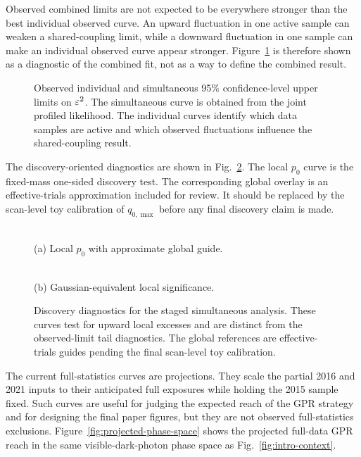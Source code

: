 Observed combined limits are not expected to be everywhere stronger than the best
individual observed curve. An upward fluctuation in one active sample can weaken a
shared-coupling limit, while a downward fluctuation in one sample can make an
individual observed curve appear stronger. Figure~\ref{fig:individual-overlay} is
therefore shown as a diagnostic of the combined fit, not as a way to define the
combined result.

\begin{figure}[t]
\centering
{}
\caption{Observed individual and simultaneous 95\% confidence-level upper limits on
$\varepsilon^2$. The simultaneous curve is obtained from the joint profiled likelihood. The
individual curves identify which data samples are active and which observed
fluctuations influence the shared-coupling result.}
\label{fig:individual-overlay}
\end{figure}

The discovery-oriented diagnostics are shown in Fig.~\ref{fig:combined-discovery}.
The local $p_0$ curve is the fixed-mass one-sided discovery test. The corresponding
global overlay is an effective-trials approximation included for review. It should be
replaced by the scan-level toy calibration of $q_{0,\max}$ before any final discovery
claim is made.

\begin{figure}[t]
\centering
\begin{minipage}{0.48\textwidth}
\centering
{}\\
(a) Local $p_0$ with approximate global guide.
\end{minipage}
\hfill
\begin{minipage}{0.48\textwidth}
\centering
{}\\
(b) Gaussian-equivalent local significance.
\end{minipage}
\caption{Discovery diagnostics for the staged simultaneous analysis. These curves test
for upward local excesses and are distinct from the observed-limit tail diagnostics.
The global references are effective-trials guides pending the final scan-level toy
calibration.}
\label{fig:combined-discovery}
\end{figure}

The current full-statistics curves are projections. They scale the partial 2016 and
2021 inputs to their anticipated full exposures while holding the 2015 sample fixed.
Such curves are useful for judging the expected reach of the GPR strategy and for
designing the final paper figures, but they are not observed full-statistics
exclusions. Figure~\ref{fig:projected-phase-space} shows the projected full-data GPR
reach in the same visible-dark-photon phase space as Fig.~\ref{fig:intro-context}.

